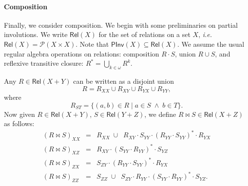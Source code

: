 \documentclass[a4paper,11pt]{article}
\newcommand{\PInv}[1]{\mathsf{PInv}(#1)}
\newcommand{\Rel}[1]{\mathsf{Rel}(#1)}
\newcommand{\pow}[1]{\mathcal{P}(#1)}
\newcommand{\invcomp}{\bowtie}
\newcommand{\ie}{\textit{i.e.}\ }
\begin{document}
\paragraph{Composition}
Finally, we consider composition. We begin with some preliminaries on
partial involutions.
We write $\Rel{X}$ for the set of relations on a set $X$, \ie
$\Rel{X} = \pow{X \times X}$. Note that $\PInv{X} \subseteq
\Rel{X}$. We assume the usual regular algebra operations on relations:
composition $R \cdot S$, union $R \cup S$, and reflexive transitive
closure: $R^{\ast} = \bigcup_{k \in \omega} R^{k}$.

Any $R \in \Rel{X + Y}$ can be written as a disjoint union
\[ R = R_{XX} \cup R_{XY} \cup R_{YX} \cup R_{YY} , \]
where
\[ R_{ST} = \{ (a, b) \in R \mid a \in S \; \wedge \; b \in T \} . \]
Now given $R \in \Rel{X + Y}$, $S \in \Rel{Y + Z}$, we define $R
\invcomp S \in \Rel{X + Z}$ as follows:
\[ \begin{array}{rcl}
(R \invcomp S)_{XX} & = & R_{XX} \; \cup \;\; R_{XY} \cdot S_{YY} \cdot
(R_{YY} \cdot S_{YY})^{\ast} \cdot R_{YX} \\
(R \invcomp S)_{XZ} & = & R_{XY} \cdot (S_{YY} \cdot
R_{YY})^{\ast} \cdot S_{YZ} \\
(R \invcomp S)_{ZX} & = & S_{ZY} \cdot (R_{YY} \cdot
S_{YY})^{\ast} \cdot R_{YX} \\
(R \invcomp S)_{ZZ} & = & S_{ZZ} \; \cup \;\; S_{ZY} \cdot R_{YY} \cdot
(S_{YY} \cdot R_{YY})^{\ast} \cdot S_{YZ} .
\end{array} \]
\end{document}
